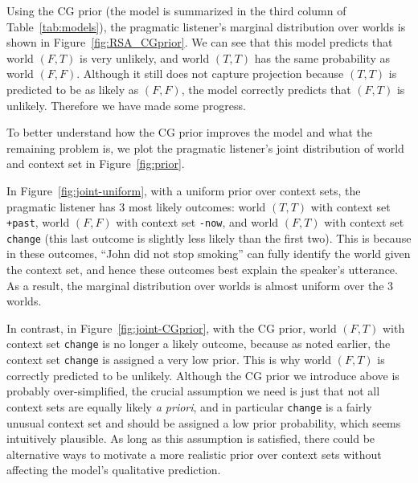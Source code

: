 
Using the CG prior (the model is summarized in the third column of Table~\ref{tab:models}), the pragmatic
 listener's marginal distribution over worlds is shown in Figure~\ref{fig:RSA_CGprior}.
We can see that this model predicts that world $(F, T)$ is very unlikely,
 and world $(T, T)$ has the same probability as world $(F, F)$. 
Although it still does not capture projection because $(T, T)$ is predicted to be
 as likely as $(F, F)$, the model correctly predicts that $(F, T)$ is unlikely. 
Therefore we have made some progress.

To better understand how the CG prior improves the model and what the remaining
 problem is, we plot the pragmatic listener's joint distribution of world and 
 context set in Figure~\ref{fig:prior}. 

In Figure~\ref{fig:joint-uniform}, with a uniform prior 
 over context sets, the pragmatic listener has 3 most likely outcomes: 
 world $(T, T)$ with context set \verb=+past=, world $(F, F)$ with context set \verb=-now=, and world $(F, T)$ with context set \verb=change= (this last outcome
 is slightly less likely than the first two).
This is because in these outcomes, ``John did not stop smoking'' can fully identify
 the world given the context set, and hence these outcomes best 
 explain the speaker's utterance.
As a result, the marginal distribution over worlds is almost uniform over 
 the 3 worlds.
 
In contrast, in Figure~\ref{fig:joint-CGprior}, with the CG prior, 
 world $(F, T)$ with context set \verb=change= is no longer a likely outcome, 
 because as noted earlier, the context set \verb=change= is assigned a very low prior.
This is why world $(F, T)$ is correctly predicted to be unlikely.
Although the CG prior we introduce above is probably over-simplified, the crucial
 assumption we need is just that not all context sets are equally likely \emph{a priori}, and in particular \verb=change= is a fairly unusual context set and 
 should be assigned a low prior probability, which seems intuitively plausible.
As long as this assumption is satisfied, 
 there could be alternative ways to motivate a more realistic prior over 
 context sets without affecting the model's qualitative prediction.
 
